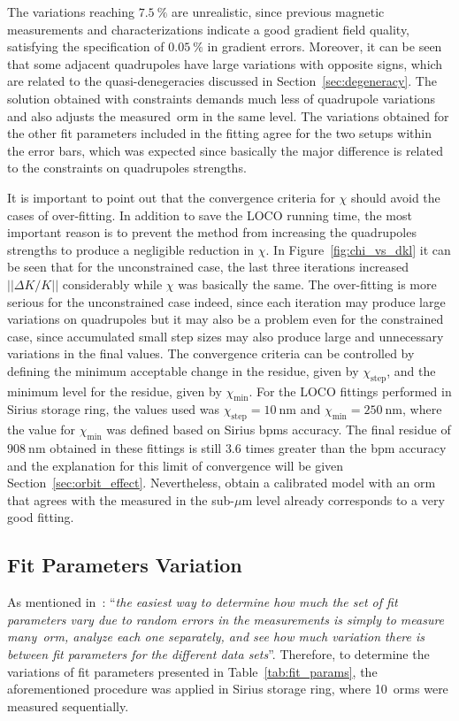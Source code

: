 The variations reaching $\SI{7.5}{\%}$ are unrealistic, since previous magnetic measurements and characterizations indicate a good gradient field quality, satisfying the specification of $\SI{0.05}{\%}$ in gradient errors. Moreover, it can be seen that some adjacent quadrupoles have large variations with opposite signs, which are related to the quasi-denegeracies discussed in Section~\ref{sec:degeneracy}. The solution obtained with constraints demands much less of quadrupole variations and also adjusts the measured~\gls{orm} in the same level. The variations obtained for the other fit parameters included in the fitting agree for the two setups within the error bars, which was expected since basically the major difference is related to the constraints on quadrupoles strengths.

It is important to point out that the convergence criteria for $\chi$ should avoid the cases of over-fitting. In addition to save the LOCO running time, the most important reason is to prevent the method from increasing the quadrupoles strengths to produce a negligible reduction in $\chi$. In Figure~\ref{fig:chi_vs_dkl} it can be seen that for the unconstrained case, the last three iterations increased $||\Delta K/K||$ considerably while $\chi$ was basically the same. The over-fitting is more serious for the unconstrained case indeed, since each iteration may produce large variations on quadrupoles but it may also be a problem even for the constrained case, since accumulated small step sizes may also produce large and unnecessary variations in the final values. The convergence criteria can be controlled by defining the minimum acceptable change in the residue, given by $\chi_{\mathrm{step}}$, and the minimum level for the residue, given by $\chi_{\mathrm{min}}$. For the LOCO fittings performed in Sirius storage ring, the values used was $\chi_{\mathrm{step}} = \SI{10}{\nano\meter}$ and $\chi_{\mathrm{min}} = \SI{250}{\nano\meter}$, where the value for $\chi_{\mathrm{min}}$ was defined based on Sirius \glspl{bpm} accuracy. The final residue of $\SI{908}{\nano\meter}$ obtained in these fittings is still $3.6$ times greater than the \gls{bpm} accuracy and the explanation for this limit of convergence will be given Section~\ref{sec:orbit_effect}. Nevertheless, obtain a calibrated model with an \gls{orm} that agrees with the measured in the sub-$\mu$m level already corresponds to a very good fitting.

\subsection{Fit Parameters Variation}\label{subsec:fit_var}
As mentioned in~\cite{safranek1997}: ``\textit{the easiest way to determine how much the set of fit parameters vary due to random errors in the measurements is simply to measure many~\gls{orm}, analyze each one separately, and see how much variation there is between fit parameters for the different data sets}''. Therefore, to determine the variations of fit parameters presented in Table~\ref{tab:fit_params}, the aforementioned procedure was applied in Sirius storage ring, where 10~\glspl{orm} were measured sequentially. 

